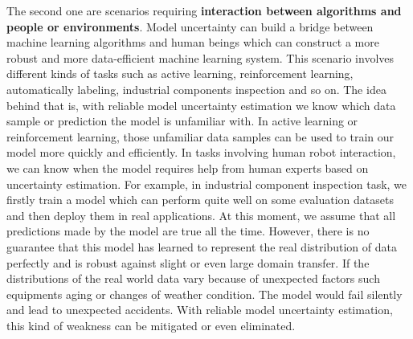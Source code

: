 The second one are scenarios requiring \textbf{interaction between algorithms and people or environments}. Model uncertainty can build a bridge between machine learning algorithms and human beings which can construct a more robust and more data-efficient machine learning system. This scenario involves different kinds of tasks such as active learning\cite{gal2017deep}, reinforcement learning\cite{blundell2015weight}\cite{osband2016deep}\cite{gal2016improving}, automatically labeling, industrial components inspection and so on. The idea behind that is, with reliable model uncertainty estimation we know which data sample or prediction the model is unfamiliar with. In active learning or reinforcement learning, those unfamiliar data samples can be used to train our model more quickly and efficiently. In tasks involving human robot interaction, we can know when the model requires help from human experts based on uncertainty estimation. For example, in industrial component inspection task, we firstly train a model which can perform quite well on some evaluation datasets and then deploy them in real applications. At this moment, we assume that all predictions made by the model are true all the time. However, there is no guarantee that this model has learned to represent the real distribution of data perfectly and is robust against slight or even large domain transfer. If the distributions of the real world data vary because of unexpected factors such equipments aging or changes of weather condition. The model would fail silently and lead to unexpected accidents. With reliable model uncertainty estimation, this kind of weakness can be mitigated or even eliminated. 

